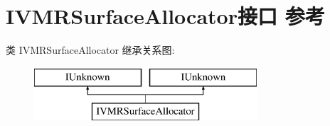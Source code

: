 \hypertarget{interface_i_v_m_r_surface_allocator}{}\section{I\+V\+M\+R\+Surface\+Allocator接口 参考}
\label{interface_i_v_m_r_surface_allocator}
类 I\+V\+M\+R\+Surface\+Allocator 继承关系图\+:\begin{figure}[H]
\begin{center}
\leavevmode
\includegraphics[height=2.000000cm]{interface_i_v_m_r_surface_allocator}
\end{center}
\end{figure}
